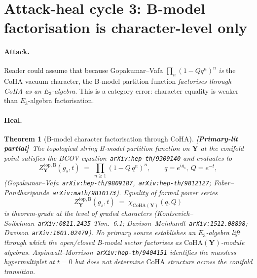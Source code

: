 \documentclass[11pt]{amsart}
\newtheorem{theorem}{Theorem}[section]
\theoremstyle{definition}
\providecommand{\CoHA}{\mathrm{CoHA}}
\providecommand{\bY}{\mathbf{Y}}
\providecommand{\ClaimStatusPartialPrimaryLit}{\textbf{\textsf{[Primary-lit partial]}}}
\begin{document}
\section{Attack-heal cycle 3: B-model factorisation is character-level
  only}

\paragraph*{Attack.}
Reader could assume that because Gopakumar--Vafa
$\prod_n(1-Qq^n)^n$ \emph{is} the CoHA vacuum character, the B-model
partition function \emph{factorises through CoHA as an
$E_3$-algebra}. This is a category error: character equality is
weaker than $E_3$-algebra factorisation.

\paragraph*{Heal.}

\begin{theorem}[B-model character factorisation through $\CoHA$]
\label{thm:b-model-character-factorisation}
\ClaimStatusPartialPrimaryLit\
The topological string B-model partition function on $\bY$ at the
conifold point satisfies the BCOV
equation~\texttt{arXiv:hep-th/9309140} and evaluates to
\[
  Z^{\mathrm{top,B}}_{\bY}(g_s, t)
  \;=\; \prod_{n \geq 1} (1 - Q\, q^n)^n,
  \qquad q = e^{i g_s},\ Q = e^{-t},
\]
(Gopakumar--Vafa~\texttt{arXiv:hep-th/9809187},~\texttt{arXiv:hep-th/9812127};
Faber--Pandharipande~\texttt{arXiv:math/9810173}). Equality of formal
power series
\[
  Z^{\mathrm{top,B}}_{\bY}(g_s, t)
  \;=\; \chi_{\CoHA(\bY)}(q, Q)
\]
is \emph{theorem-grade at the level of graded characters}
(Kontsevich--Soibelman~\texttt{arXiv:0811.2435} Thm.~6.1;
Davison--Meinhardt~\texttt{arXiv:1512.08898};
Davison~\texttt{arXiv:1601.02479}). No primary source establishes an
$E_3$-algebra lift through which the open/closed B-model sector
factorises as $\CoHA(\bY)$-module algebras.
Aspinwall--Morrison~\texttt{arXiv:hep-th/9404151} identifies the
massless hypermultiplet at $t=0$ but does not determine $\CoHA$
structure across the conifold transition.
\end{theorem}
\end{document}
